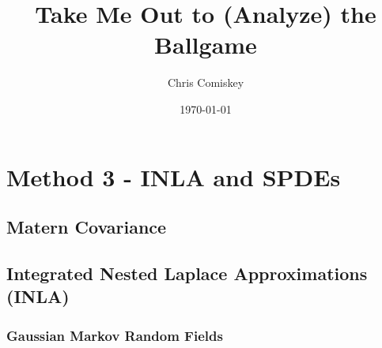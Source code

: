 \documentclass{article}
\title{Take Me Out to (Analyze) the Ballgame}
\author{Chris Comiskey}
\date{\today}
\begin{document}
\maketitle{}

\tableofcontents




\section{Method 3 - INLA and SPDEs} %



\subsection{Matern Covariance}

\subsection{Integrated Nested Laplace Approximations (INLA)}

\subsubsection{Gaussian Markov Random Fields}
\end{document}
